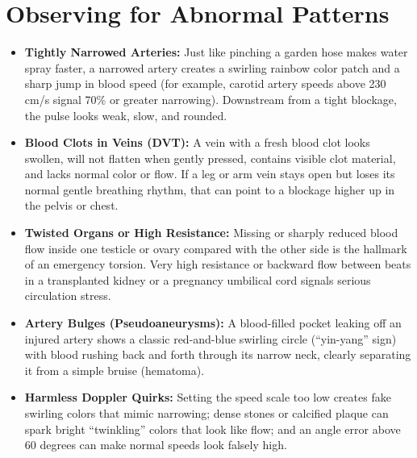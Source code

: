\section{Observing for Abnormal Patterns}
\begin{itemize}
\item \textbf{Tightly Narrowed Arteries:} Just like pinching a garden hose makes water spray faster, a narrowed artery creates a swirling rainbow color patch and a sharp jump in blood speed (for example, carotid artery speeds above 230 cm/s signal 70\% or greater narrowing). Downstream from a tight blockage, the pulse looks weak, slow, and rounded.
\item \textbf{Blood Clots in Veins (DVT):} A vein with a fresh blood clot looks swollen, will not flatten when gently pressed, contains visible clot material, and lacks normal color or flow. If a leg or arm vein stays open but loses its normal gentle breathing rhythm, that can point to a blockage higher up in the pelvis or chest.
\item \textbf{Twisted Organs or High Resistance:} Missing or sharply reduced blood flow inside one testicle or ovary compared with the other side is the hallmark of an emergency torsion. Very high resistance or backward flow between beats in a transplanted kidney or a pregnancy umbilical cord signals serious circulation stress.
\item \textbf{Artery Bulges (Pseudoaneurysms):} A blood-filled pocket leaking off an injured artery shows a classic red-and-blue swirling circle (``yin-yang'' sign) with blood rushing back and forth through its narrow neck, clearly separating it from a simple bruise (hematoma).
\item \textbf{Harmless Doppler Quirks:} Setting the speed scale too low creates fake swirling colors that mimic narrowing; dense stones or calcified plaque can spark bright ``twinkling'' colors that look like flow; and an angle error above 60 degrees can make normal speeds look falsely high.
\end{itemize}

